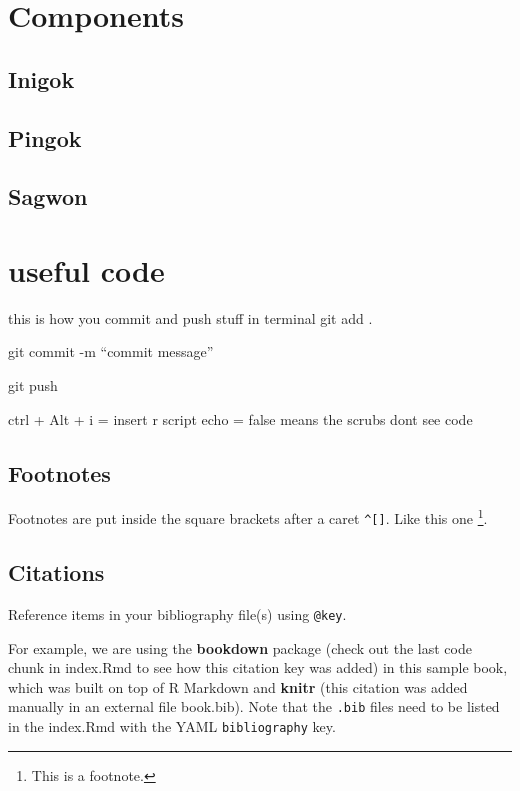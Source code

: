 \documentclass[
]{book}
\theoremstyle{definition}
\theoremstyle{definition}
\theoremstyle{definition}
\theoremstyle{definition}
\theoremstyle{remark}
\begin{document}
\hypertarget{components}{%
\chapter{Components}\label{components}}

\hypertarget{inigok}{%
\section{Inigok}\label{inigok}}

\hypertarget{pingok}{%
\section{Pingok}\label{pingok}}

\hypertarget{sagwon}{%
\section{Sagwon}\label{sagwon}}

\hypertarget{useful-code}{%
\chapter{useful code}\label{useful-code}}

this is how you commit and push stuff in terminal
git add .

git commit -m ``commit message''

git push

ctrl + Alt + i = insert r script
echo = false means the scrubs dont see code

\hypertarget{footnotes}{%
\section{Footnotes}\label{footnotes}}

Footnotes are put inside the square brackets after a caret \texttt{\^{}{[}{]}}. Like this one \footnote{This is a footnote.}.

\hypertarget{citations}{%
\section{Citations}\label{citations}}

Reference items in your bibliography file(s) using \texttt{@key}.

For example, we are using the \textbf{bookdown} package \citep{R-bookdown} (check out the last code chunk in index.Rmd to see how this citation key was added) in this sample book, which was built on top of R Markdown and \textbf{knitr} \citep{xie2015} (this citation was added manually in an external file book.bib).
Note that the \texttt{.bib} files need to be listed in the index.Rmd with the YAML \texttt{bibliography} key.
\end{document}
